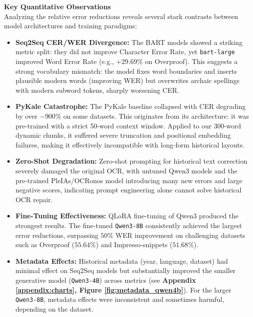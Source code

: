 \documentclass[11pt]{extarticle}
\begin{document}
\noindent\textbf{Key Quantitative Observations}\\
Analyzing the relative error reductions reveals several stark contrasts between model architectures and training paradigms:
\begin{itemize}
    \item \textbf{Seq2Seq CER/WER Divergence:} The BART models showed a striking metric split: they did not improve Character Error Rate, yet \texttt{bart-large} improved Word Error Rate (e.g., $+29.69\%$ on Overproof). This suggests a strong vocabulary mismatch: the model fixes word boundaries and inserts plausible modern words (improving WER) but overwrites archaic spellings with modern subword tokens, sharply worsening CER.
    
    \item \textbf{PyKale Catastrophe:} The PyKale baseline collapsed with CER degrading by over $-900\%$ on some datasets. This originates from its architecture: it was pre-trained with a strict 50-word context window. Applied to our 300-word dynamic chunks, it suffered severe truncation and positional embedding failures, making it effectively incompatible with long-form historical layouts.
    
    \item \textbf{Zero-Shot Degradation:} Zero-shot prompting for historical text correction severely damaged the original OCR, with untuned Qwen3 models and the pre-trained PleIAs/OCRonos model introducing many new errors and large negative scores, indicating prompt engineering alone cannot solve historical OCR repair.
    
    \item \textbf{Fine-Tuning Effectiveness:} QLoRA fine-tuning of Qwen3 produced the strongest results. The fine-tuned \texttt{Qwen3-8B} consistently achieved the largest error reductions, surpassing $50\%$ WER improvement on challenging datasets such as Overproof ($55.64\%$) and Impresso-snippets ($51.68\%$). 
    
    \item \textbf{Metadata Effects:} Historical metadata (year, language, dataset) had minimal effect on Seq2Seq models but substantially improved the smaller generative model (\texttt{Qwen3-4B}) across metrics (see \textbf{Appendix \ref{appendix:charts}, Figure \ref{fig:metadata_qwen4b}}). For the larger \texttt{Qwen3-8B}, metadata effects were inconsistent and sometimes harmful, depending on the dataset.
\end{itemize}
\end{document}
